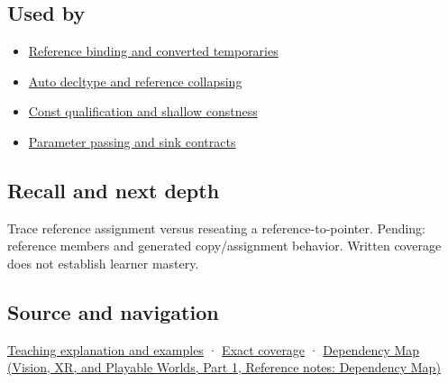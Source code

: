\subsection{Used by}\label{appendix-d6d562ca9fbb-used-by}

\hypertarget{appendix-d6d562ca9fbb-used-by}{}

\begin{itemize}
\tightlist
\item
  \hyperref[appendix-37856d997bb0]{Reference binding and converted temporaries}
\item
  \hyperref[appendix-5d4252a42886]{Auto decltype and reference collapsing}
\item
  \hyperref[appendix-c25d60fed375]{Const qualification and shallow constness}
\item
  \hyperref[appendix-d5908f75721f]{Parameter passing and sink contracts}
\end{itemize}

\subsection{Recall and next depth}\label{appendix-d6d562ca9fbb-recall-and-next-depth}

\hypertarget{appendix-d6d562ca9fbb-recall-and-next-depth}{}

Trace reference assignment versus reseating a reference-to-pointer. Pending: reference members and generated copy/assignment behavior. Written coverage does not establish learner mastery.

\subsection{Source and navigation}\label{appendix-d6d562ca9fbb-source-and-navigation}

\hypertarget{appendix-d6d562ca9fbb-source-and-navigation}{}

\hyperref[01-foundations-i-ch003-giving-another-name-to-a-live-object]{Teaching explanation and examples} · \hyperref[appendix-fd090d982a15-m008---parts-113-126]{Exact coverage} · \href{../07-Vision-XR-and-Playable-Worlds-P01/main.pdf\#nameddest=appendix-4ad47bdd269a}{Dependency Map (Vision, XR, and Playable Worlds, Part 1, Reference notes: Dependency Map)}
